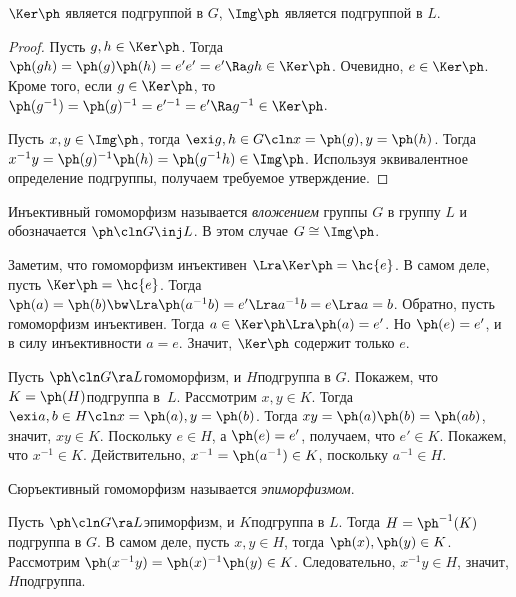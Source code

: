 \documentclass[a4paper]{article}
\newcommand{\kph}{\Ker \ph}
\begin{document}
\begin{stm}
$\kph$ является подгруппой в $G$, $\Img \ph$ является подгруппой в $L$.
\end{stm}
\begin{proof}
Пусть $g, h\in \kph$. Тогда $\ph(gh)=\ph(g)\ph(h)=e'e'=e' \Ra gh \in \kph$. Очевидно, $e \in \kph$. Кроме
того, если $g \in \kph$, то $\ph(g^{-1})=\ph(g)^{-1}=e'^{-1}=e' \Ra g^{-1} \in \kph$.

Пусть $x,y\in \Img \ph$, тогда $\exi g,h\in G\cln x=\ph(g), y=\ph(h)$. Тогда
$x^{-1}y=\ph(g)^{-1}\ph(h)=\ph(g^{-1}h)\in \Img\ph$. Используя эквивалентное определение подгруппы, получаем
требуемое утверждение.
\end{proof}

\begin{df}
Инъективный гомоморфизм называется \emph{вложением} группы $G$ в группу $L$ и обозначается $\ph\cln G \inj
L$. В этом случае $G \cong \Img \ph$.
\end{df}

Заметим, что гомоморфизм инъективен $\Lra \kph = \hc{e}$. В самом деле, пусть $\kph =\hc{e}$. Тогда
$\ph(a)=\ph(b) \bw\Lra \ph(a^{-1}b)=e' \Lra a^{-1}b=e \Lra a=b$. Обратно, пусть гомоморфизм инъективен. Тогда
$a \in \kph \Lra \ph(a)=e'$. Но $\ph(e)=e'$, и в силу инъективности $a=e$. Значит, $\kph$ содержит только $e$.

Пусть $\ph\cln G \ra L$\т гомоморфизм, и $H$\т подгруппа в $G$. Покажем, что $K = \ph(H)$\т подгруппа в~$L$.
Рассмотрим $x, y \in K$. Тогда $\exi a, b \in H\cln x = \ph(a), y = \ph(b)$. Тогда $xy
=\ph(a)\ph(b)=\ph(ab)$, значит, $xy \in K$. Поскольку $e \in H$, а $\ph(e) =e'$, получаем, что $e' \in K$.
Покажем, что $x^{-1} \in K$. Действительно, $x^{-1}=\ph(a^{-1}) \in K$, поскольку $a^{-1} \in H$.

\begin{df}
Сюръективный гомоморфизм называется \emph{эпиморфизмом}.
\end{df}

Пусть $\ph\cln G \ra L$\т эпиморфизм, и $K$\т подгруппа в $L$. Тогда $H = \ph^{-1}(K)$\т подгруппа в $G$. В
самом деле, пусть $x,y \in H$, тогда $\ph(x), \ph(y) \in K$. Рассмотрим $\ph(x^{-1}y)=\ph(x)^{-1}\ph(y) \in
K$. Следовательно, $x^{-1}y \in H$, значит, $H$\т подгруппа.
\end{document}
